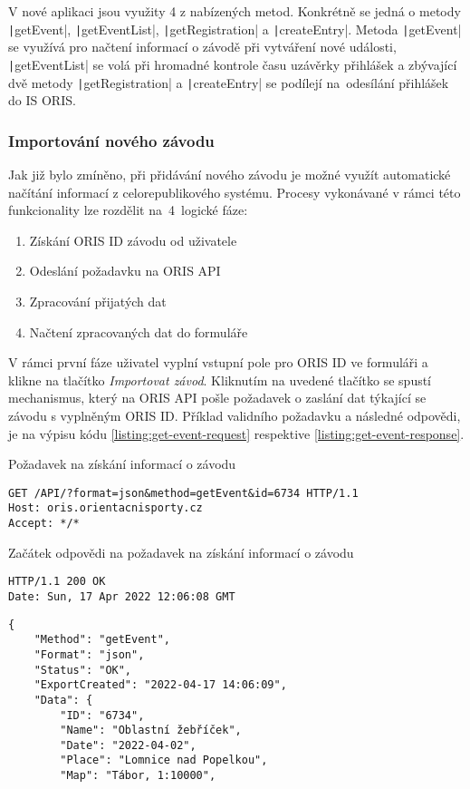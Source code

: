 V nové aplikaci jsou využity 4 z nabízených metod. Konkrétně se jedná o metody \texttt|getEvent|, \texttt|getEventList|, \texttt|getRegistration| a \texttt|createEntry|. Metoda \texttt|getEvent| se využívá pro načtení informací o závodě při vytváření nové události, \texttt|getEventList| se volá při hromadné kontrole času uzávěrky přihlášek a zbývající dvě metody \texttt|getRegistration| a \texttt|createEntry| se podílejí na~odesílání přihlášek do IS ORIS.

\subsubsection{Importování nového závodu}
Jak již bylo zmíněno, při přidávání nového závodu je možné využít automatické načítání informací z celorepublikového systému. Procesy vykonávané v rámci této funkcionality lze rozdělit na~4~logické fáze:
\begin{enumerate}
    \item Získání ORIS ID závodu od uživatele
    \item Odeslání požadavku na ORIS API
    \item Zpracování přijatých dat
    \item Načtení zpracovaných dat do formuláře
\end{enumerate}

V rámci první fáze uživatel vyplní vstupní pole pro ORIS ID ve formuláři a klikne na tlačítko \emph{Importovat závod}. Kliknutím na uvedené tlačítko se spustí mechanismus, který na ORIS API pošle požadavek o zaslání dat týkající se závodu s vyplněným ORIS ID. Příklad validního požadavku a následné odpovědi, je na výpisu kódu \ref{listing:get-event-request} respektive \ref{listing:get-event-response}.

\begin{listing}[h]
    \caption{Požadavek na získání informací o závodu}\label{listing:get-event-request}
    \begin{verbatim}
GET /API/?format=json&method=getEvent&id=6734 HTTP/1.1
Host: oris.orientacnisporty.cz
Accept: */*
    \end{verbatim}
\end{listing}
\vspace{-3mm}

\begin{listing}[h]
    \caption{Začátek odpovědi na požadavek na získání informací o závodu}\label{listing:get-event-response}
    \begin{verbatim}
HTTP/1.1 200 OK
Date: Sun, 17 Apr 2022 12:06:08 GMT

    \end{verbatim}
    \vspace{-11mm}
    \begin{verbatim}
{
    "Method": "getEvent",
    "Format": "json",
    "Status": "OK",
    "ExportCreated": "2022-04-17 14:06:09",
    "Data": {
        "ID": "6734",
        "Name": "Oblastní žebříček",
        "Date": "2022-04-02",
        "Place": "Lomnice nad Popelkou",
        "Map": "Tábor, 1:10000",
    \end{verbatim}
\end{listing}

